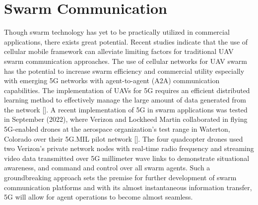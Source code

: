 \section*{Swarm Communication}
Though swarm technology has yet to be practically utilized in commercial applications, there exists great potential. Recent studies indicate that the use of cellular mobile framework can alleviate limiting factors for traditional UAV swarm communication approaches. The use of cellular networks for UAV swarm has the potential to increase swarm efficiency and commercial utility especially with emerging 5G networks with agent-to-agent (A2A) communication capabilities. The implementation of UAVs for 5G requires an efficient distributed learning method to effectively manage the large amount of data generated from the network []. A recent implementation of 5G in swarm applications was tested in September (2022), where Verizon and Lockheed Martin collaborated in flying 5G-enabled drones at the aerospace organization’s test range in Waterton, Colorado over their 5G.MIL pilot network []. The four quadcopter drones used two Verizon’s private network nodes with real-time radio frequency and streaming video data transmitted over 5G millimeter wave links to demonstrate situational awareness, and command and control over all swarm agents. Such a groundbreaking approach sets the premise for further development of swarm communication platforms and with its almost instantaneous information transfer, 5G will allow for agent operations to become almost seamless.